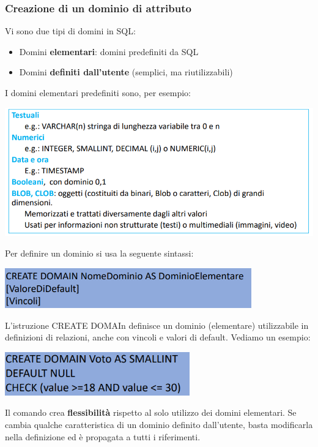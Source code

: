 \documentclass[12pt]{article}
\begin{document}
\subsubsection{Creazione di un dominio di attributo}
Vi sono due tipi di domini in SQL:
\begin{itemize}
    \item Domini \textbf{elementari}: domini predefiniti da SQL
    \item Domini \textbf{definiti dall'utente} (semplici, ma riutilizzabili) 
\end{itemize}
\newpage
\noindent
I domini elementari predefiniti sono, per esempio:
\begin{center}
    \includegraphics[width = 1\textwidth]{Images/178.PNG}
\end{center}
Per definire un dominio si usa la seguente sintassi:
\begin{center}
    \includegraphics[width = 0.80\textwidth]{Images/179.PNG}
\end{center}
L'istruzione CREATE DOMAIn definisce un dominio (elementare) utilizzabile in definizioni di relazioni, anche con vincoli e valori di default.
Vediamo un esempio:
\begin{center}
    \includegraphics[width = 0.60\textwidth]{Images/180.PNG}
\end{center}
Il comando crea \textbf{flessibilità} rispetto al solo utilizzo dei domini elementari.
Se cambia qualche caratteristica di un dominio definito dall'utente, basta modificarla nella definizione ed è propagata a tutti i riferimenti.
\end{document}
